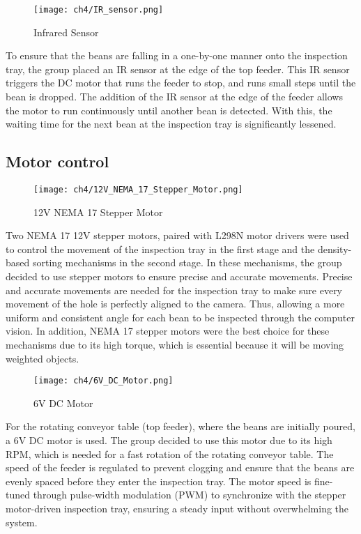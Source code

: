 \begin{figure}[H]
    \centering
    \texttt{[image: ch4/IR\_sensor.png]} %
    \caption{Infrared Sensor}
    \label{fig:infrared_sensor}
\end{figure}

To ensure that the beans are falling in a one-by-one manner onto the inspection tray, the group placed an IR sensor at the edge of the top feeder. This IR sensor triggers the DC motor that runs the feeder to stop, and runs small steps until the bean is dropped. The addition of the IR sensor at the edge of the feeder allows the motor to run continuously until another bean is detected. With this, the waiting time for the next bean at the inspection tray is significantly lessened. 

\subsection{Motor control}

\begin{figure}[H]
    \centering
    \texttt{[image: ch4/12V\_NEMA\_17\_Stepper\_Motor.png]} %
    \caption{12V NEMA 17 Stepper Motor}
    \label{fig:stepper_motor}
\end{figure}

Two NEMA 17 12V stepper motors, paired with L298N motor drivers were used to control the movement of the inspection tray in the first stage and the density-based sorting mechanisms in the second stage. In these mechanisms, the group decided to use stepper motors to ensure precise and accurate movements. Precise and accurate movements are needed for the inspection tray to make sure every movement of the hole is perfectly aligned to the camera. Thus, allowing a more uniform and consistent angle for each bean to be inspected through the computer vision. In addition, NEMA 17 stepper motors were the best choice for these mechanisms due to its high torque, which is essential because it will be moving weighted objects. 

\begin{figure}[H]
    \centering
    \texttt{[image: ch4/6V\_DC\_Motor.png]} %
    \caption{6V DC Motor}
    \label{fig:6v_dc_motor}
\end{figure}

For the rotating conveyor table (top feeder), where the beans are initially poured, a 6V DC motor is used. The group decided to use this motor due to its high RPM, which is needed for a fast rotation of the rotating conveyor table. The speed of the feeder is regulated to prevent clogging and ensure that the beans are evenly spaced before they enter the inspection tray. The motor speed is fine-tuned through pulse-width modulation (PWM) to synchronize with the stepper motor-driven inspection tray, ensuring a steady input without overwhelming the system.

